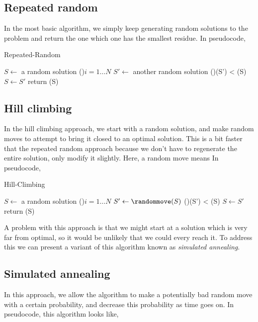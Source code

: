 \documentclass[a4paper, 10pt, twocolumn, twoside]{article}
\begin{document}
\subsection{Repeated random}

In the most basic algorithm, we simply keep generating random solutions to the problem and return the one which one has the smallest residue. In pseudocode,

\begin{algorithm}
\caption{Repeated-Random}
\DontPrintSemicolon
$S\leftarrow$ a random solution\;
\For(){$i = 1 \ldots N$}{
    $S'\leftarrow$ another random solution\;
    \If(){\residue(S') < \residue(S)}{
        $S\leftarrow S'$\;
    }
}
return \residue(S)
\end{algorithm}

\subsection{Hill climbing}

In the hill climbing approach, we start with a random solution, and make random moves to attempt to bring it closed to an optimal solution. This is a bit faster that the repeated random approach because we don't have to regenerate the entire solution, only modify it slightly. Here, a random move means In pseudocode,

\begin{algorithm}
\caption{Hill-Climbing}
\DontPrintSemicolon
$S\leftarrow$ a random solution\;
\For(){$i = 1 \ldots N$}{
    $S'\leftarrow\randommove(S)$\;
    \If(){\residue(S') < \residue(S)}{
        $S\leftarrow S'$\;
    }
}
return \residue(S)
\end{algorithm}

A problem with this approach is that we might start at a solution which is very far from optimal, so it would be unlikely that we could every reach it. To address this we can present a variant of this algorithm known as \emph{simulated annealing}.

\subsection{Simulated annealing}

In this approach, we allow the algorithm to make a potentially bad random move with a certain probability, and decrease this probability as time goes on. In pseudocode, this algorithm looks like,
\end{document}
